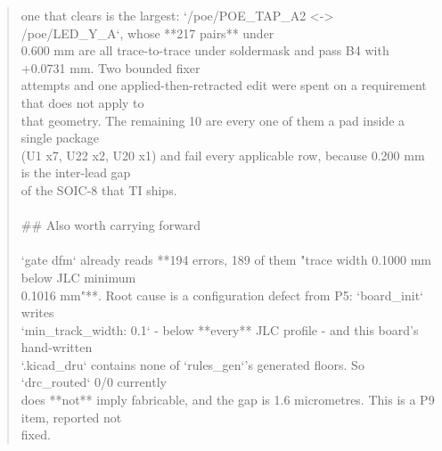 \documentclass[11pt,a4paper]{article}
\begin{document}
\begin{quote}
one that clears is the largest: `/poe/POE\_TAP\_A2 \textless{}-\textgreater{} /poe/LED\_Y\_A`, whose {*}{*}217 pairs{*}{*} under\\
0.600 mm are all trace-to-trace under soldermask and pass B4 with +0.0731 mm. Two bounded fixer\\
attempts and one applied-then-retracted edit were spent on a requirement that does not apply to\\
that geometry. The remaining 10 are every one of them a pad inside a single package\\
(U1 x7, U22 x2, U20 x1) and fail every applicable row, because 0.200 mm is the inter-lead gap\\
of the SOIC-8 that TI ships.\\
~\\
\#\# Also worth carrying forward\\
~\\
`gate dfm` already reads {*}{*}194 errors, 189 of them "trace width 0.1000 mm below JLC minimum\\
0.1016 mm"{*}{*}. Root cause is a configuration defect from P5: `board\_init` writes\\
`min\_track\_width: 0.1` - below {*}{*}every{*}{*} JLC profile - and this board's hand-written\\
`.kicad\_dru` contains none of `rules\_gen`'s generated floors. So `drc\_routed` 0/0 currently\\
does {*}{*}not{*}{*} imply fabricable, and the gap is 1.6 micrometres. This is a P9 item, reported not\\
fixed.
\end{quote}
\end{document}
